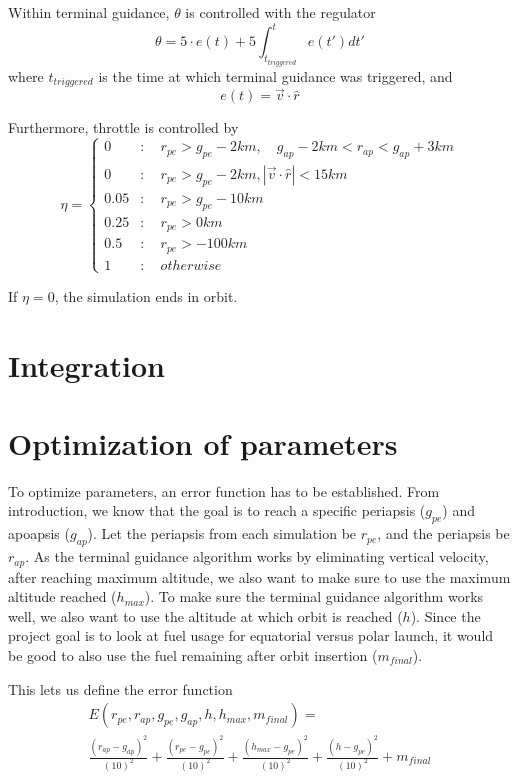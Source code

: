 \documentclass[11pt]{article}
\begin{document}
Within terminal guidance, $\theta$ is controlled with the regulator 
$$
\theta = 5 \cdot e(t) + 5 \int_{t_{triggered}}^t e(t') dt'
$$
where $t_{triggered}$ is the time at which terminal guidance was triggered, and
$$
e(t) = \vec{v} \cdot \hat{r}
$$

Furthermore, throttle is controlled by
$$
\eta = \begin{cases}
0 & : \quad r_{pe} > g_{pe} - 2 km, \quad g_{ap} - 2 km < r_{ap} < g_{ap} + 3 km \\
0 & : \quad r_{pe} > g_{pe} - 2 km, \left| \vec{v} \cdot \hat{r} \right| < 15 km \\
0.05 & : \quad r_{pe} > g_{pe} - 10 km \\
0.25 & : \quad r_{pe} > 0 km \\
0.5 & : \quad r_{pe} > -100 km \\
1 & :  \quad otherwise
\end{cases}
$$

If $\eta = 0$, the simulation ends in orbit.

\section{Integration}

\section{Optimization of parameters}
To optimize parameters, an error function has to be established.
From introduction, we know that the goal is to reach a specific periapsis ($g_{pe}$) and apoapsis ($g_{ap}$). 
Let the periapsis from each simulation be $r_{pe}$, and the periapsis be $r_{ap}$.
As the terminal guidance algorithm works by eliminating vertical velocity, after reaching maximum altitude, we also want to make sure to use the maximum altitude reached ($h_{max}$).
To make sure the terminal guidance algorithm works well, we also want to use the altitude at which orbit is reached ($h$).
Since the project goal is to look at fuel usage for equatorial versus polar launch, it would be good to also use the fuel remaining after orbit insertion ($m_{final}$).

This lets us define the error function
$$
\begin{aligned}
E(r_{pe}, r_{ap}, g_{pe}, g_{ap}, h, h_{max}, m_{final}) = \\
\frac{{\left( r_{ap} - g_{ap} \right)}^2}{{\left( 10 \right)}^2} +
\frac{{\left( r_{pe} - g_{pe} \right)}^2}{{\left( 10 \right)}^2} +
\frac{{\left( h_{max} - g_{pe} \right)}^2}{{\left( 10 \right)}^2} +
\frac{{\left( h - g_{pe} \right)}^2}{{\left( 10 \right)}^2}
+ m_{final}
\end{aligned}
$$
\end{document}
